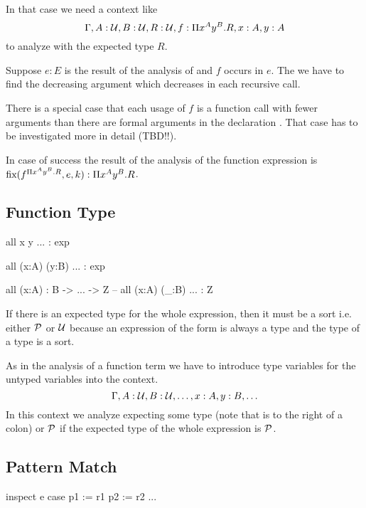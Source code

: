 In that case we need a context like
$$
  \Gamma, A:{\cal{U}}, B:{\cal{U}}, R:{\cal{U}}, f:\Pi x^A y^B.R, x:A, y:A
$$
%
to analyze  with the expected type $R$.

Suppose $e:E$ is the result of the analysis of  and $f$ occurs in
$e$. The we have to find the decreasing argument which decreases in each
recursive call.

There is a special case that each usage of $f$ is a function call with fewer
arguments than there are formal arguments in the declaration . That case has to be investigated more in detail (TBD!!).

In case of success the result of the analysis of the function expression is
$\text{fix}(f^{\Pi x^A y^B. R}, e, k) : \Pi x^A y^B. R$.





\subsection{Function Type}


\begin{alba}
  all x y ... : exp

  all (x:A) (y:B) ... : exp

  all (x:A) : B -> ... -> Z        -- all (x:A) (_:B) ... : Z
\end{alba}

If there is an expected type for the whole expression, then it must be a sort
i.e. either ${\cal{P}}$ or ${\cal{U}}$ because an expression of the form  is always a type and the type of a type is a sort.

As in the analysis of a function term we have to introduce type variables for
the untyped variables into the context.
$$
\Gamma, A:{\cal{U}}, B:{\cal{U}}, \ldots, x:A, y:B, \ldots
$$
%
In this context we analyze  expecting some type (note that
 is to the right of a colon) or ${\cal{P}}$ if the expected type of the
whole expression is ${\cal{P}}$.





\vskip 5mm

\subsection{Pattern Match}

\begin{alba}
  inspect
    e
  case
    p1 := r1
    p2 := r2
    ...
\end{alba}


